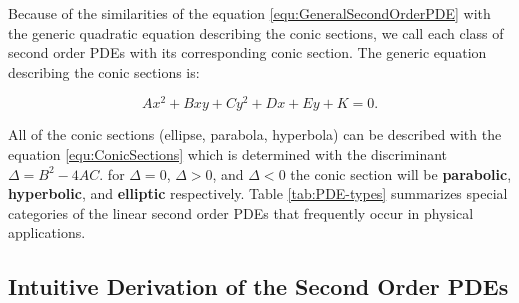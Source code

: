 Because of the similarities of the equation \ref{equ:GeneralSecondOrderPDE} with the generic quadratic equation describing the conic sections, we call each class of second order PDEs with its corresponding conic section. The generic equation describing the conic sections is:

\begin{equation}
	A x^2 + B x y + C y^2 + D x + E y + K = 0.
	\label{equ:ConicSections}
\end{equation}


All of the conic sections (ellipse, parabola, hyperbola) can be described with the equation \ref{equ:ConicSections} which is determined with the discriminant $ \Delta = B^2 - 4 A C $. for $ \Delta=0 $, $ \Delta > 0 $, and $ \Delta < 0 $ the conic section will be \textbf{parabolic}, \textbf{hyperbolic}, and \textbf{elliptic} respectively. Table \ref{tab:PDE-types} summarizes special categories of the linear second order PDEs that frequently occur in physical applications. \newline


\begin{table}[]
	\centering
	\caption{A summary of the three class of second order linear PDE.}
	\label{tab:PDE-types}
\end{table}


\subsection{Intuitive Derivation of the Second Order PDEs}